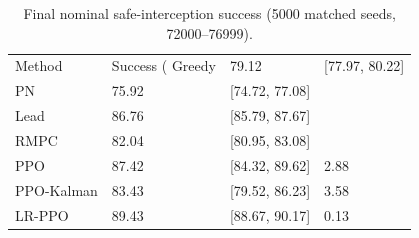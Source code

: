 \begin{table}[t]
\centering
\caption{Final nominal safe-interception success (5000 matched seeds, 72000--76999).}
\label{tab:nominal_performance}
\begin{tabular}{llll}
\hline
Method & Success (%
\hline
Greedy & 79.12 & [77.97, 80.22] &  \\
PN & 75.92 & [74.72, 77.08] &  \\
Lead & 86.76 & [85.79, 87.67] &  \\
RMPC & 82.04 & [80.95, 83.08] &  \\
PPO & 87.42 & [84.32, 89.62] & 2.88 \\
PPO-Kalman & 83.43 & [79.52, 86.23] & 3.58 \\
LR-PPO & 89.43 & [88.67, 90.17] & 0.13 \\
\hline
\end{tabular}
\end{table}
